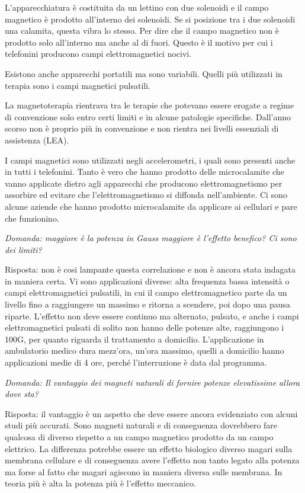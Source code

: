 \documentclass[]{article}
\begin{document}
L'apparecchiatura è costituita da un lettino con due solenoidi e il
campo magnetico è prodotto all'interno dei solenoidi. Se si posizione
tra i due solenoidi una calamita, questa vibra lo stesso. Per dire che
il campo magnetico non è prodotto solo all'interno ma anche al di fuori.
Questo è il motivo per cui i telefonini producono campi elettromagnetici
nocivi.

Esistono anche apparecchi portatili ma sono variabili. Quelli più
utilizzati in terapia sono i campi magnetici pulsatili.

La magnetoterapia rientrava tra le terapie che potevano essere erogate a
regime di convenzione solo entro certi limiti e in alcune patologie
specifiche. Dall'anno scorso non è proprio più in convenzione e non
rientra nei livelli essenziali di assistenza (LEA).

I campi magnetici sono utilizzati negli accelerometri, i quali sono
presenti anche in tutti i telefonini. Tanto è vero che hanno prodotto
delle microcalamite che vanno applicate dietro agli apparecchi che
producono elettromagnetismo per assorbire ed evitare che
l'elettromagnetismo si diffonda nell'ambiente. Ci sono alcune aziende
che hanno prodotto microcalamite da applicare ai cellulari e pare che
funzionino.

\emph{Domanda: maggiore è la potenza in Gauss maggiore è l'effetto
benefico? Ci sono dei limiti? }

Risposta: non è cosi lampante questa correlazione e non è ancora stata
indagata in maniera certa. Vi sono applicazioni diverse: alta frequenza
bassa intensità o campi elettromagnetici pulsatili, in cui il campo
elettromagnetico parte da un livello fino a raggiungere un massimo e
ritorna a scendere, poi dopo una pausa riparte. L'effetto non deve
essere continuo ma alternato, pulsato, e anche i campi elettromagnetici
pulsati di solito non hanno delle potenze alte, raggiungono i 100G, per
quanto riguarda il trattamento a domicilio. L'applicazione in
ambulatorio medico dura mezz'ora, un'ora massimo, quelli a domicilio
hanno applicazioni medie di 4 ore, perché l'interruzione è data dal
programma.

\emph{Domanda: Il vantaggio dei magneti naturali di fornire potenze
elevatissime allora dove sta? }

Risposta: il vantaggio è un aspetto che deve essere ancora evidenziato
con alcuni studi più accurati. Sono magneti naturali e di conseguenza
dovrebbero fare qualcosa di diverso rispetto a un campo magnetico
prodotto da un campo elettrico. La differenza potrebbe essere un effetto
biologico diverso magari sulla membrana cellulare e di conseguenza avere
l'effetto non tanto legato alla potenza ma forse al fatto che magari
agiscono in maniera diversa sulle membrana. In teoria più è alta la
potenza più è l'effetto meccanico.
\end{document}
